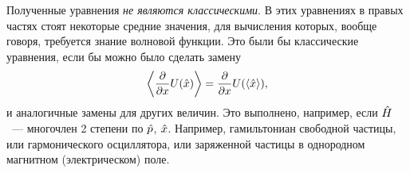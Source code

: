 \Rem
Полученные уравнения \emph{не являются классическими}. В этих уравнениях в правых частях стоят некоторые средние значения, для вычисления которых, вообще говоря, требуется знание волновой функции. Это были бы классические уравнения, если бы можно было сделать замену
      $$
        \left\langle  \dfrac{\partial }{\partial x} U(\Hat x)  \right\rangle = \dfrac{\partial }{\partial x} U( \left\langle \Hat x \right\rangle ),
      $$
      и аналогичные замены для других величин. Это выполнено, например, если $\Hat H$~--- многочлен 2 степени по $\Hat p$, $\Hat x$. Например, гамильтониан свободной частицы, или гармонического осциллятора, или заряженной частицы в однородном магнитном (электрическом) поле.

